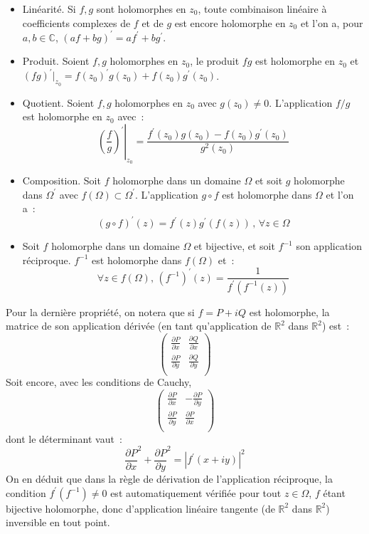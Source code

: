 \begin{fprop}
\begin{itemize}
\item Linéarité. Si $f,g$ sont holomorphes en $z_0$, toute
  combinaison linéaire à coefficients complexes de $f$ et de $g$ est
  encore holomorphe en $z_0$ et l'on a, pour $ a,b \in \mathbb{C}$, 
$(a f + b g)^\prime = a f^\prime + b g^\prime$.
\item Produit. Soient $f,g$ holomorphes en $z_0$, le produit $fg$ est
  holomorphe en $z_0$ et $(fg)^\prime |_{z_0} = f(z_0)^\prime g(z_0) + f(z_0) g^\prime(z_0)$.
\item Quotient. Soient $f,g$ holomorphes en $z_0$ avec $g(z_0)
  \neq 0$. L'application $f/g$ est holomorphe en $z_0$ avec~:
\[
\left .\left ( \frac{f}{g} \right )^\prime \right |_{z_0}  = \frac{f^\prime(z_0) g(z_0) - f(z_0) g^\prime(z_0)}{g^2(z_0)}
\]
\item Composition. Soit $f$ holomorphe dans un domaine $\Omega$ et
  soit $g$ holomorphe dans $\Omega^\prime$ avec $f(\Omega) \subset
  \Omega^\prime$. L'application $g \circ f$ est holomorphe dans
  $\Omega$ et l'on a~:
\[
(g \circ f )^\prime (z) = f^\prime (z) g^\prime (f(z)) \, , \, \forall
z \in \Omega
\]
\item Soit $f$ holomorphe dans un domaine $\Omega$ et bijective, et
  soit $f^{-1}$ son application réciproque. $f^{-1}$ est holomorphe
  dans $f(\Omega)$ et~:
\[
\forall z \in f(\Omega), \, (f^{-1})^\prime(z) = \frac{1}{f^\prime (f^{-1}(z))}
\]
\end{itemize}
\end{fprop}
Pour la dernière propriété, on notera que si $f=P+iQ$ est holomorphe, la matrice
de son application dérivée (en tant qu'application de $\mathbb{R}^2$ dans $\mathbb{R}^2$)
est~:
\[
\left (
\begin{array}{cc}
\frac{\partial P}{\partial x} & \frac{\partial Q}{\partial x} \\
\frac{\partial P}{\partial y} & \frac{\partial Q}{\partial y} \\
\end{array}
\right )
\]
Soit encore, avec les conditions de Cauchy,
\[
\left (
\begin{array}{cc}
\frac{\partial P}{\partial x} & -\frac{\partial P}{\partial y} \\
\frac{\partial P}{\partial y} & \frac{\partial P}{\partial x} \\
\end{array}
\right )
\]
dont le déterminant vaut~:
\[
\frac{\partial P}{\partial x}^2 + \frac{\partial P}{\partial y}^2 =
|f^\prime(x+iy)|^2 
\]
On en déduit que dans la règle de dérivation de l'application
réciproque, la condition $f^\prime(f^{-1}) \neq 0$ est automatiquement
vérifiée pour tout $z \in \Omega$, $f$ étant bijective holomorphe,
donc d'application linéaire tangente (de $\mathbb{R}^2$ dans
$\mathbb{R}^2$) inversible en tout point.


